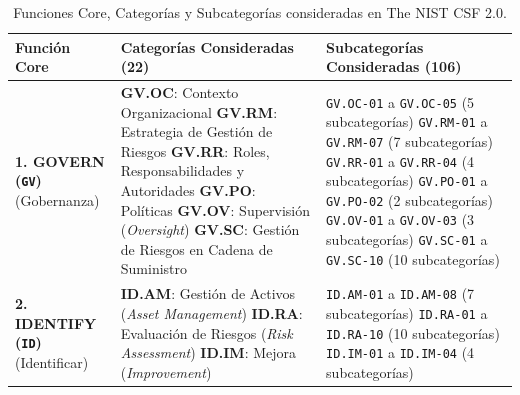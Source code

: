 \documentclass[letterpaper,11pt]{article}
\begin{document}
\begin{table}[H]
\centering
\footnotesize
\setlength{\tabcolsep}{5pt}
\renewcommand{\arraystretch}{1.24}
\caption{Funciones Core, Categorías y Subcategorías consideradas en The NIST CSF 2.0.}
\label{tab:estructura-csf}
\begin{tabular}{|L{3.0cm}|L{7.2cm}|C{5.8cm}|}
\hline
{}
\textbf{Función Core} & \textbf{Categorías Consideradas (22)} & \textbf{Subcategorías Consideradas (106)} \\
\hline

\textbf{1. GOVERN (\texttt{GV})}\newline (Gobernanza) &
\textbf{GV.OC}: Contexto Organizacional\newline
\textbf{GV.RM}: Estrategia de Gestión de Riesgos\newline
\textbf{GV.RR}: Roles, Responsabilidades y Autoridades\newline
\textbf{GV.PO}: Políticas\newline
\textbf{GV.OV}: Supervisión (\textit{Oversight})\newline
\textbf{GV.SC}: Gestión de Riesgos en Cadena de Suministro &
\texttt{GV.OC-01} a \texttt{GV.OC-05} (5 subcategorías)\newline
\texttt{GV.RM-01} a \texttt{GV.RM-07} (7 subcategorías)\newline
\texttt{GV.RR-01} a \texttt{GV.RR-04} (4 subcategorías)\newline
\texttt{GV.PO-01} a \texttt{GV.PO-02} (2 subcategorías)\newline
\texttt{GV.OV-01} a \texttt{GV.OV-03} (3 subcategorías)\newline
\texttt{GV.SC-01} a \texttt{GV.SC-10} (10 subcategorías) \\
\hline

\textbf{2. IDENTIFY (\texttt{ID})}\newline (Identificar) &
\textbf{ID.AM}: Gestión de Activos (\textit{Asset Management})\newline
\textbf{ID.RA}: Evaluación de Riesgos (\textit{Risk Assessment})\newline
\textbf{ID.IM}: Mejora (\textit{Improvement}) &
\texttt{ID.AM-01} a \texttt{ID.AM-08} (7 subcategorías)\newline
\texttt{ID.RA-01} a \texttt{ID.RA-10} (10 subcategorías)\newline
\texttt{ID.IM-01} a \texttt{ID.IM-04} (4 subcategorías) \\
\hline


\end{tabular}
\end{table}
\end{document}
